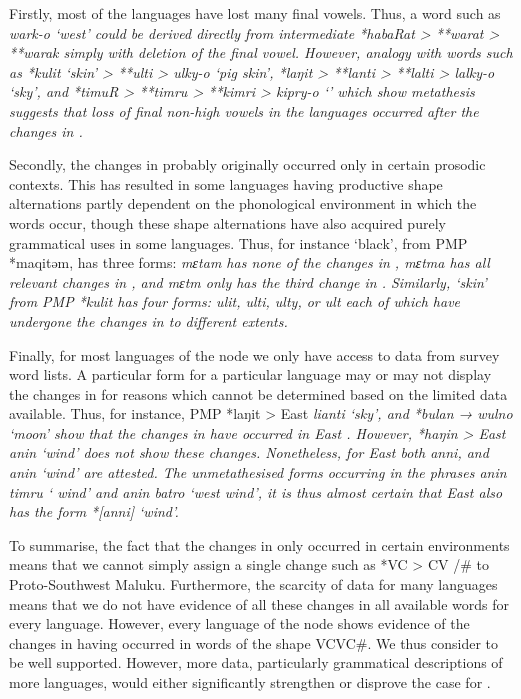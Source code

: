 Firstly, most of the  languages have lost many final vowels.
Thus, a word such as  \it{wark-o} ‘west’ could
be derived directly from intermediate *habaRat > **warat > **warak
simply with deletion of the final vowel.
However, analogy with words such as
*kulit `skin' > **ulti > \it{ulky-o} `pig skin',
*laŋit > **lanti > **lalti > \it{lalky-o} ‘sky’, and
*timuR > **timru > **kimri > \it{kipry-o} ‘’
which show metathesis suggests that loss of final
non-high vowels in the  languages
occurred after the changes in .

Secondly, the changes in  probably originally occurred only
in certain prosodic contexts.
This has resulted in some languages having productive shape alternations
partly dependent on the phonological environment in which the
words occur, though these shape alternations have also acquired purely grammatical
uses in some languages.
Thus, for instance  ‘black’,
from PMP *maqitəm, has three forms: \it{mɛtam} has none of the
changes in , \it{mɛtma} has all relevant changes in ,
and \it{mɛtm} only has the third change in .
Similarly,  ‘skin’ from PMP *kulit has four forms: \it{ulit,
ulti, ulty,} or \it{ult} each of which have undergone the changes
in  to different extents.

Finally, for most languages of the  node
we only have access to data from survey word lists.
A particular form for a particular language may or may not display
the changes in  for reasons which cannot be determined based
on the limited data available.
Thus, for instance, PMP *laŋit >  East  \it{lianti}
‘sky’, and *bulan → \it{wulno} ‘moon’ show that the changes in 
have occurred in  East .
However, *haŋin >  East  \it{anin} ‘wind’ does not show these changes.
Nonetheless, for  East  both \it{anni,}
and \it{anin} ‘wind’ are attested.
The unmetathesised forms occurring
in the phrases \it{anin timru} ‘ wind’
and \it{anin batro} ‘west wind’,
it is thus almost certain that  East  also has the form *[anni] ‘wind’.

To summarise, the fact that the changes in  only occurred
in certain environments means that we cannot simply assign a
single change such as *VC > CV /{\gap}{\#} to Proto-Southwest Maluku.
Furthermore, the scarcity of data for many languages means that
we do not have evidence of all these changes in all available
words for every language.
However, every language of the  node shows
evidence of the changes in  having occurred in words of the shape VCVC{\#}.
We thus consider  to be well supported.
However, more data, particularly grammatical descriptions of
more languages, would either significantly strengthen or disprove the case for .

